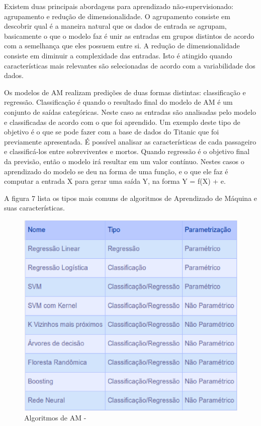 Existem duas principais abordagens para aprendizado não-supervisionado: agrupamento e redução de dimensionalidade. O agrupamento consiste em descobrir qual é a maneira natural que os dados de entrada se agrupam, basicamente o que o modelo faz é unir as entradas em grupos distintos de acordo com a semelhança que eles possuem entre si. A redução de dimensionalidade consiste em diminuir a complexidade das entradas. Isto é atingido quando características mais relevantes são selecionadas de acordo com a variabilidade dos dados.

Os modelos de AM realizam predições de duas formas distintas: classificação e regressão. Classificação é quando o resultado final do modelo de AM é um conjunto de saídas categóricas. Neste caso as entradas são analisadas pelo modelo e classificadas de acordo com o que foi aprendido. Um exemplo deste tipo de objetivo é o que se pode fazer com a base de dados do Titanic que foi previamente apresentada. É possível analisar as características de cada passageiro e classificá-los entre sobreviventes e mortos. Quando regressão é o objetivo final da previsão, então o modelo irá resultar em um valor contínuo. Nestes casos o aprendizado do modelo se deu na forma de uma função, e o que ele faz é  computar a entrada X para gerar uma saída Y, na forma Y = f(X) + e. 

A figura 7 lista os tipos mais comuns de algoritmos de Aprendizado de Máquina e suas características.


\begin{figure}[!h]
\centering
\includegraphics[keepaspectratio=true,scale=0.60]
{figuras/Tipos_de_Modelo.eps}
\caption{Algoritmos de AM -  \cite{real2013}}
\label{over}
\end{figure}

